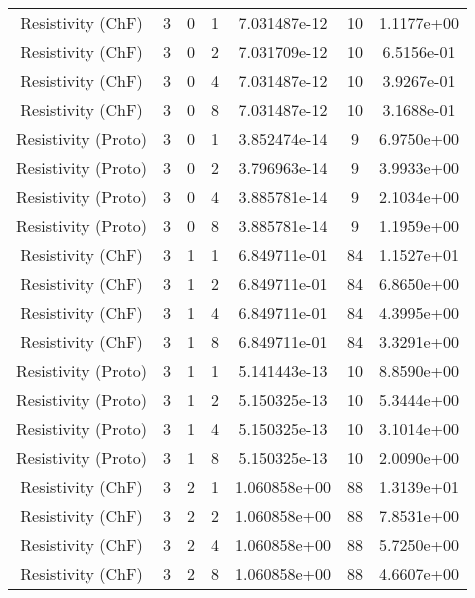 \documentclass{article}
\begin{document}
\begin{small} 
  \begin{table} 
    \begin{center}
      \begin{tabular}{|c|c|c|c|c|c||c|} \hline 
        \hline 
        Resistivity      (ChF) & 3 & 0 & 1& 7.031487e-12 & 10 & 1.1177e+00\\
        Resistivity      (ChF) & 3 & 0 & 2& 7.031709e-12 & 10 & 6.5156e-01\\
        Resistivity      (ChF) & 3 & 0 & 4& 7.031487e-12 & 10 & 3.9267e-01\\
        Resistivity      (ChF) & 3 & 0 & 8& 7.031487e-12 & 10 & 3.1688e-01\\
        Resistivity    (Proto) & 3 & 0 & 1& 3.852474e-14 & 9 & 6.9750e+00\\
        Resistivity    (Proto) & 3 & 0 & 2& 3.796963e-14 & 9 & 3.9933e+00\\
        Resistivity    (Proto) & 3 & 0 & 4& 3.885781e-14 & 9 & 2.1034e+00\\
        Resistivity    (Proto) & 3 & 0 & 8& 3.885781e-14 & 9 & 1.1959e+00\\
        \hline 
        Resistivity      (ChF) & 3 & 1 & 1& 6.849711e-01 & 84 & 1.1527e+01\\
        Resistivity      (ChF) & 3 & 1 & 2& 6.849711e-01 & 84 & 6.8650e+00\\
        Resistivity      (ChF) & 3 & 1 & 4& 6.849711e-01 & 84 & 4.3995e+00\\
        Resistivity      (ChF) & 3 & 1 & 8& 6.849711e-01 & 84 & 3.3291e+00\\
        Resistivity    (Proto) & 3 & 1 & 1& 5.141443e-13 & 10 & 8.8590e+00\\
        Resistivity    (Proto) & 3 & 1 & 2& 5.150325e-13 & 10 & 5.3444e+00\\
        Resistivity    (Proto) & 3 & 1 & 4& 5.150325e-13 & 10 & 3.1014e+00\\
        Resistivity    (Proto) & 3 & 1 & 8& 5.150325e-13 & 10 & 2.0090e+00\\
        \hline 
        Resistivity      (ChF) & 3 & 2 & 1& 1.060858e+00 & 88 & 1.3139e+01\\
        Resistivity      (ChF) & 3 & 2 & 2& 1.060858e+00 & 88 & 7.8531e+00\\
        Resistivity      (ChF) & 3 & 2 & 4& 1.060858e+00 & 88 & 5.7250e+00\\
        Resistivity      (ChF) & 3 & 2 & 8& 1.060858e+00 & 88 & 4.6607e+00\\

\end{tabular}
\end{center}
\end{table}
\end{small}
\end{document}
